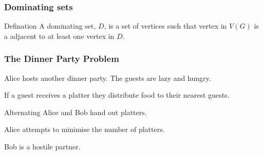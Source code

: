 \documentclass{beamer}
\begin{document}
\begin{frame}
    \frametitle{Dominating sets}
    
    \begin{block}{Defination}        
        A dominating set, $D$, is a set of vertices such that vertex in $V(G)$ is a adjacent to at least one vertex in $D$.
    \end{block}
    
\end{frame}

\begin{frame}
    \frametitle{The Dinner Party Problem}
    Alice hosts another dinner party. The guests are lazy and hungry.     
    
    \bigskip
    \pause
    
    If a guest receives a platter they distribute food to their nearest guests.
    
    \bigskip
    \pause
    
    Alternating Alice and Bob hand out platters.
    
    \bigskip
    \pause
    
    Alice attempts to minimise the number of platters. 
    
    \bigskip
    \pause
    
    Bob is a hostile partner.
\end{frame}
\end{document}
